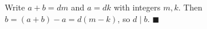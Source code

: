 Write $a+b=dm$ and $a=dk$ with integers $m,k$. Then $b=(a+b)-a=d(m-k)$, so $d\mid b$. $\blacksquare$
